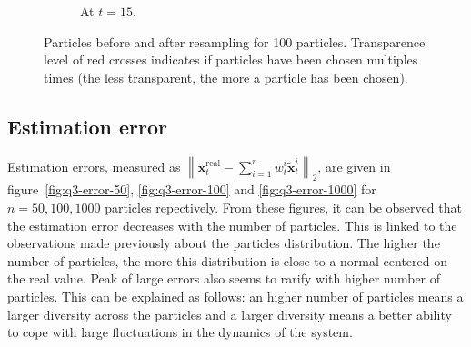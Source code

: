\documentclass[english, DIV=13]{scrartcl}
\newcommand\norm[1]{\left\lVert#1\right\rVert}
\begin{document}
\begin{figure}
\begin{subfigure}{0.49\textwidth}
        \caption{At $t=15$.}
        \label{fig:particle-15-100}
    \end{subfigure}
    \caption{Particles before and after resampling for 100 particles.
    Transparence level of red crosses indicates if particles have been chosen
    multiples times (the less transparent, the more a particle has been chosen).}
\end{figure}

\subsection{Estimation error}
Estimation errors, measured as 
$\norm{\mathbf{x}_t^{\text{real}} - \sum_{i=1}^n w_t^i\tilde{\mathbf{x}}_t^i}_2$,
are given in figure~\ref{fig:q3-error-50}, \ref{fig:q3-error-100} and
\ref{fig:q3-error-1000} for $n = 50, 100, 1000$ particles repectively.
From these figures, it can be observed that the estimation error decreases with the
number of particles. This is linked to the observations made previously about the
particles distribution. The higher the number of particles, the more this distribution
is close to a normal centered on the real value. Peak of large errors also seems to
rarify with higher number of particles. This can be explained as follows: an higher
number of particles means a larger diversity across the particles and a larger diversity
means a better ability to cope with large fluctuations in the dynamics of the system.
\end{document}
